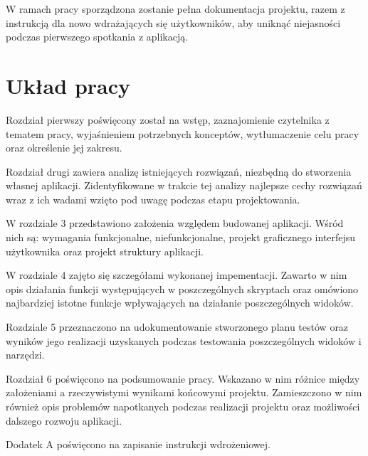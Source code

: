 W ramach pracy sporządzona zostanie pełna dokumentacja projektu, razem z instrukcją dla nowo wdrażających się użytkowników, aby uniknąć niejasności podczas pierwszego spotkania z aplikacją. 


\section{Układ pracy}
Rozdział pierwszy poświęcony został na wstęp, zaznajomienie czytelnika z tematem pracy, wyjaśnieniem potrzebnych konceptów, wytłumaczenie celu pracy oraz określenie jej zakresu. 

Rozdział drugi zawiera analizę istniejących rozwiązań, niezbędną do stworzenia własnej aplikacji. Zidentyfikowane w trakcie tej analizy najlepsze cechy rozwiązań wraz z ich wadami wzięto pod uwagę podczas etapu projektowania.

W rozdziale 3 przedstawiono założenia względem budowanej aplikacji. Wśród nich są: wymagania funkcjonalne, niefunkcjonalne, projekt graficznego interfejsu użytkownika oraz projekt struktury aplikacji.

W rozdziale 4 zajęto się szczegółami wykonanej impementacji.  Zawarto w nim opis działania funkcji występujących w poszczególnych skryptach oraz omówiono najbardziej istotne funkcje wpływających na działanie poszczególnych widoków.

Rozdziale 5 przeznaczono na udokumentowanie stworzonego planu testów oraz wyników jego realizacji uzyskanych podczas testowania poszczególnych widoków i narzędzi.

Rozdział 6 poświęcono na podsumowanie pracy. Wskazano w nim różnice między założeniami a rzeczywistymi wynikami końcowymi projektu. Zamieszczono  w nim również opis problemów napotkanych podczas realizacji projektu oraz możliwości dalszego rozwoju aplikacji.

Dodatek A poświęcono na zapisanie instrukcji wdrożeniowej.
